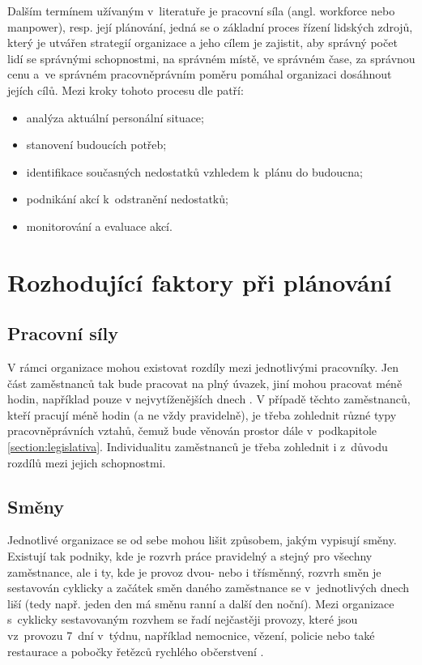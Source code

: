 \documentclass[twoside]{ctuthesis}
\begin{document}
Dalším termínem užívaným v~literatuře je pracovní síla (angl. workforce nebo manpower), resp. její plánování, jedná se o základní proces řízení lidských zdrojů, který je utvářen strategií organizace a jeho cílem je zajistit, aby správný počet lidí se správnými schopnostmi, na správném místě, ve správném čase, za správnou cenu a~ve správném pracovněprávním poměru pomáhal organizaci dosáhnout jejích cílů. Mezi kroky tohoto procesu dle \cite{cipd2020workforce} patří:
\begin{itemize}
	\item analýza aktuální personální situace;
	\item stanovení budoucích potřeb;
	\item identifikace současných nedostatků vzhledem k~plánu do budoucna;
	\item podnikání akcí k~odstranění nedostatků;
	\item monitorování a evaluace akcí.
\end{itemize}

\section{Rozhodující faktory při plánování}

\subsection{Pracovní síly}
V rámci organizace mohou existovat rozdíly mezi jednotlivými pracovníky. Jen část zaměstnanců tak bude pracovat na plný úvazek, jiní mohou pracovat méně hodin, například pouze v nejvytíženějších dnech \cite{lin2015}. V případě těchto zaměstnanců, kteří pracují méně hodin (a ne vždy pravidelně), je třeba zohlednit různé typy pracovněprávních vztahů, čemuž bude věnován prostor dále v~podkapitole \ref{section:legislativa}. Individualitu zaměstnanců je třeba zohlednit i z~důvodu rozdílů mezi jejich schopnostmi.

\subsection{Směny}
\label{sub:smeny}
Jednotlivé organizace se od sebe mohou lišit způsobem, jakým vypisují směny. Existují tak podniky, kde je rozvrh práce pravidelný a stejný pro všechny zaměstnance, ale i ty, kde je provoz dvou- nebo i třísměnný, rozvrh směn je sestavován cyklicky a začátek směn daného zaměstnance se v~jed\-not\-li\-vý\-ch dnech liší (tedy např. jeden den má směnu ranní a další den noční). Mezi organizace s~cyklicky sestavovaným rozvhem se řadí nejčastěji provozy, které jsou vz~provozu 7~dní v~týdnu, například nemocnice, vězení, policie nebo také restaurace a pobočky řetězců rychlého občerstvení \cite{bechtold1981work}.
\end{document}
